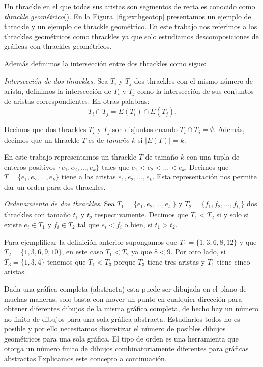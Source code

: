 Un thrackle en el que todas sus aristas son segmentos de recta es conocido como
\emph{thrackle geométrico}(\cite{Schaefer2018}). En la
Figura~\ref{fig:exthgeotop} presentamos un ejemplo de thrackle y un ejemplo de
thrackle geométrico. En este trabajo nos referimos a los thrackles geométricos
como thrackles ya que solo estudiamos descomposiciones de gráficas con
thrackles geométricos.

Además definimos la intersección entre dos thrackles como sigue:

\begin{definition}{\emph{Intersección de dos thrackles}.} Sea $T_i$ y $T_j$ dos
  thrackles con el mismo número de arista, definimos la intersección de $T_i$ y
  $T_j$ como la intersección de sus conjuntos de aristas correspondientes. En
  otras palabras:
  \[ T_i \cap T_j = E(T_i) \cap E(T_j).\]
\end{definition}

Decimos que dos thrackles $T_i$ y $T_j$ son disjuntos cuando $T_i\cap T_j = \emptyset$. Además, decimos que
un thrackle $T$ es de \emph{tamaño} $k$ si $|E(T)|=k$.

En este trabajo representamos un thrackle $T$ de tamaño $k$ con una tupla de enteros positivos
$\{e_1,e_2,\dots,e_k\}$ tales que $e_1 < e_2 < \dots < e_k$. Decimos que $T=\{e_1,e_2,\dots,e_k\}$ tiene a
las aristas $e_1,e_2,\dots,e_k$. Esta representación nos permite dar un orden para dos thrackles.

\begin{definition}{\emph{Ordenamiento de dos thrackles}.}
  Sea $T_1 =\{e_1,e_2,\dots,e_{t_1}\}$ y $T_2 =\{f_1,f_2,\dots,f_{t_2}\}$ dos thrackles con tamaño $t_1$ y
  $t_2$ respectivamente. Decimos que $T_1 < T_2$ si y solo si existe $e_i \in T_1$ y $f_i \in T_2$ tal que
  $e_i < f_i$ o bien, si $t_1 > t_2$.
\end{definition}

Para ejemplificar la definición anterior supongamos que $T_1=\{1,3,6,8,12\}$ y que $T_2=\{1,3,6,9,10\}$, en
este caso $T_1 < T_2$ ya que $8 < 9$. Por otro lado, si $T_3=\{1,3,4\}$ tenemos que $T_1 < T_3$ porque
$T_3$ tiene tres aristas y $T_1$ tiene cinco aristas.

Dada una gráfica completa (abstracta) esta puede ser dibujada en el plano
de muchas maneras, solo basta con mover un punto en cualquier dirección
para obtener diferentes dibujos de la misma gráfica completa, de hecho
hay un número no finito de dibujos para una sola gráfica abstracta. Estudiarlos
todos no es posible y por ello necesitamos discretizar el número de
posibles dibujos geométricos para una sola gráfica. El tipo de orden es
una herramienta que otorga un número finito de dibujos combinatoriamente
diferentes para gráficas abstractas.Explicamos este concepto a continuación.

